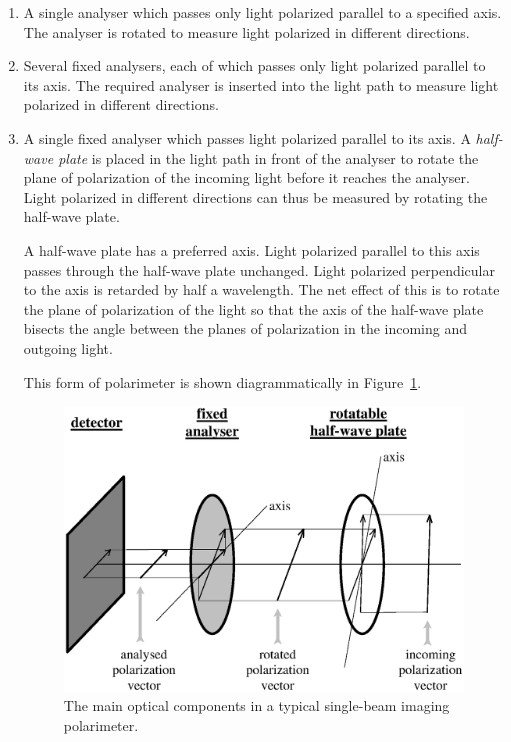 \documentclass[twoside,11pt]{article}
\newenvironment{latexonly}{}{}
\newcommand{\latex}[1]{#1}
\newcommand{\html}[1]{}
\renewcommand{\_}{\texttt{\symbol{95}}}
\begin{document}
\begin{enumerate}

\item A single analyser which passes only light polarized parallel to a
specified axis. The analyser is rotated to measure light polarized in
different directions.

\item Several fixed analysers, each of which passes only light polarized 
parallel to its axis. The required analyser is inserted into the light path
to measure light polarized in different directions.

\item A single fixed analyser which passes light polarized parallel to its axis.
A \emph{half-wave plate} is placed in the light path in front of the
analyser to rotate the plane of polarization of the incoming light
before it reaches the analyser. Light polarized in different directions
can thus be measured by rotating the half-wave plate.

A half-wave plate has a preferred axis. Light polarized parallel to this
axis passes through the half-wave plate unchanged. Light polarized
perpendicular to the axis is retarded by half a wavelength. The net
effect of this is to  rotate the plane of polarization of the light so
that the axis of the half-wave plate bisects the angle between the planes 
of polarization in the incoming and outgoing light.

This form of polarimeter is shown diagrammatically in 
\latex{Figure~\ref{fig:singopt}.} \html{the next figure:}

\begin{latexonly}
  \vspace{2mm}
  \begin{figure}[htb]
  \begin{center}
  \includegraphics[clip,scale=0.5]{sun223_figures/singopt.eps}
  \caption{The main optical components in a typical single-beam imaging polarimeter.}
  \label{fig:singopt}
  \end{center}
  \end{figure}
\end{latexonly}


\end{enumerate}
\end{document}
